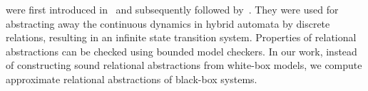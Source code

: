 

 were first introduced
in~\cite{Sankaranarayanan+Tiwari/2011/Relational} and subsequently
followed by~\cite{zutshi2012timed, mover2013time}. They were used for
abstracting away the continuous dynamics in hybrid automata by
discrete relations, resulting in an infinite state transition system.
Properties of relational abstractions can be checked using bounded
model checkers. In our work, instead of constructing sound relational
abstractions from white-box models, we compute approximate relational
abstractions of black-box systems.


